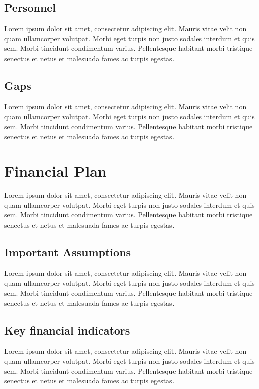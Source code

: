 \documentclass[11pt,titlepage]{article}
\begin{document}
\subsection{Personnel}
Lorem ipsum dolor sit amet, consectetur adipiscing elit. Mauris vitae velit 
non quam ullamcorper volutpat. Morbi eget turpis non justo sodales interdum 
et quis sem. Morbi tincidunt condimentum varius. Pellentesque habitant morbi 
tristique senectus et netus et malesuada fames ac turpis egestas.\newline
\subsection{Gaps}
Lorem ipsum dolor sit amet, consectetur adipiscing elit. Mauris vitae velit 
non quam ullamcorper volutpat. Morbi eget turpis non justo sodales interdum 
et quis sem. Morbi tincidunt condimentum varius. Pellentesque habitant morbi 
tristique senectus et netus et malesuada fames ac turpis egestas.\newline
\pagebreak

\section{Financial Plan}
Lorem ipsum dolor sit amet, consectetur adipiscing elit. Mauris vitae velit 
non quam ullamcorper volutpat. Morbi eget turpis non justo sodales interdum 
et quis sem. Morbi tincidunt condimentum varius. Pellentesque habitant morbi 
tristique senectus et netus et malesuada fames ac turpis egestas.\newline
\subsection{Important Assumptions}
Lorem ipsum dolor sit amet, consectetur adipiscing elit. Mauris vitae velit 
non quam ullamcorper volutpat. Morbi eget turpis non justo sodales interdum 
et quis sem. Morbi tincidunt condimentum varius. Pellentesque habitant morbi 
tristique senectus et netus et malesuada fames ac turpis egestas.\newline
\subsection{Key financial indicators}
Lorem ipsum dolor sit amet, consectetur adipiscing elit. Mauris vitae velit 
non quam ullamcorper volutpat. Morbi eget turpis non justo sodales interdum 
et quis sem. Morbi tincidunt condimentum varius. Pellentesque habitant morbi 
tristique senectus et netus et malesuada fames ac turpis egestas.\newline
\end{document}
